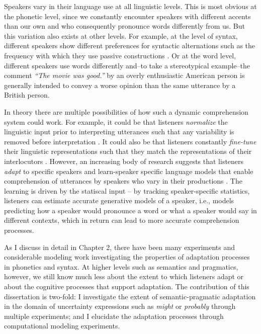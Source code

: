 Speakers vary in their language use at all linguistic levels. This is most obvious at the phonetic level, since we constantly encounter speakers with different accents than our own and who consequently pronounce words differently from us. But this variation also exists at other levels. For example, at the level of syntax, different speakers show different preferences for syntactic alternations such as the frequency with which they use passive constructions \cite{Weiner1983}. Or at the word level, different speakers use words differently and--to take a stereotypical example--the comment \textit{``The movie was good.''} by an overly enthusiastic American person is generally intended to convey a worse opinion than the same utterance by a British person.


In theory there are multiple possibilities of how such a dynamic comprehension system could work. For example, it could be that listeners \textit{normalize} the linguistic input prior to interpreting utterances such that any variability is removed before interpretation . It could also be that listeners constantly \textit{fine-tune} their linguistic representations such that they match the representations of their interlocutors . However, an increasing body of research suggests that listeners \textit{adapt} to specific speakers and learn-speaker specific language models that enable comprehension of utterances by speakers who vary in their productions \cite{Norris2003,Kraljic2007,Bradlow2008, Kamide2012,Kleinschmidt2015,Fine2016,Roettger2019}. The learning is driven by the statiscal input -- by tracking speaker-specific statistics, listeners can estimate accurate generative models of a speaker, i.e., models predicting how a speaker would pronounce a word or what a speaker would say in different contexts, which in return can lead to more accurate comprehension processes.

As I discuss in detail in Chapter 2, there have been many experiments and considerable modeling work investigating the properties of adaptation processes in phonetics and syntax. At higher levels such as semantics and pragmatics, however, we still know much less about the extent to which listeners adapt or about the cognitive processes that support adaptation. The contribution of this dissertation is two-fold: I investigate the extent of semantic-pragmatic adaptation in the domain of uncertainty expressions such as \textit{might} or \textit{probably} through multiple experiments; and I elucidate the adaptation processes through computational modeling experiments. 

